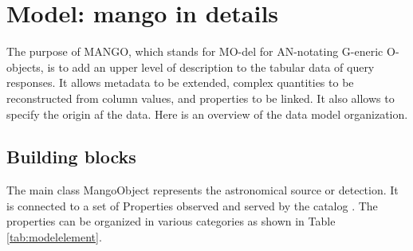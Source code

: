 
\pagebreak

\section{Model: mango in details} 
  The purpose of MANGO, which stands for MO-del for AN-notating G-eneric O-objects, is to add an upper level of description to the tabular data of query responses. It allows metadata to be extended, complex quantities to be reconstructed from column values, and properties to be linked. It also allows to specify the origin af the data.
Here is an overview of the data model organization. 

  \subsection{Building blocks}
 
 The main class MangoObject represents the astronomical source or detection.
 It is connected to a set of Properties observed and served by the catalog . 
 The properties  can be organized in various categories  as shown in Table \ref{tab:modelelement}.

